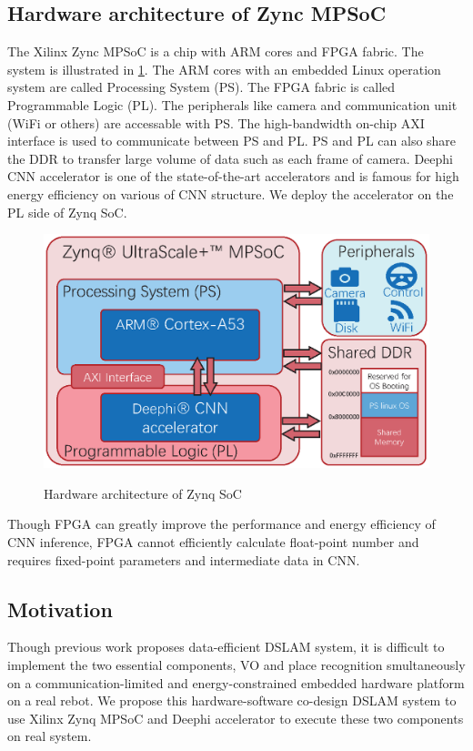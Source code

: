 \subsection{Hardware architecture of Zync MPSoC}
The Xilinx Zync MPSoC is a chip with ARM cores and FPGA fabric. The system is illustrated in \cref{fig:plps}. The ARM cores with an embedded Linux operation system are called Processing System (PS). The FPGA fabric is called Programmable Logic (PL). The peripherals like camera and communication unit (WiFi or others) are accessable with PS. The high-bandwidth on-chip AXI interface is used to communicate between PS and PL. PS and PL can also share the DDR to transfer large volume of data such as each frame of camera.
Deephi CNN accelerator \cite{Tech:2019360} is one of the state-of-the-art accelerators and is famous for high energy efficiency on various of CNN structure. We deploy the accelerator on the PL side of Zynq SoC.

\begin{figure}[thb]  
    \centering  
    {\includegraphics[width=0.95\linewidth]{fig/plps.eps}\label{fig:plps}} 
    \caption{Hardware architecture of Zynq SoC}
\end{figure}

Though FPGA can greatly improve the performance and energy efficiency of CNN inference, FPGA cannot efficiently calculate float-point number and requires fixed-point parameters and intermediate data in CNN.

\subsection{Motivation}
Though previous work \cite{Cieslewski:20187ee} proposes data-efficient DSLAM system, it is difficult to implement the two essential components, VO and place recognition smultaneously on a communication-limited and energy-constrained embedded hardware platform on a real rebot. We propose this hardware-software co-design DSLAM system to use Xilinx Zynq MPSoC and Deephi accelerator to execute these two components on real system.

